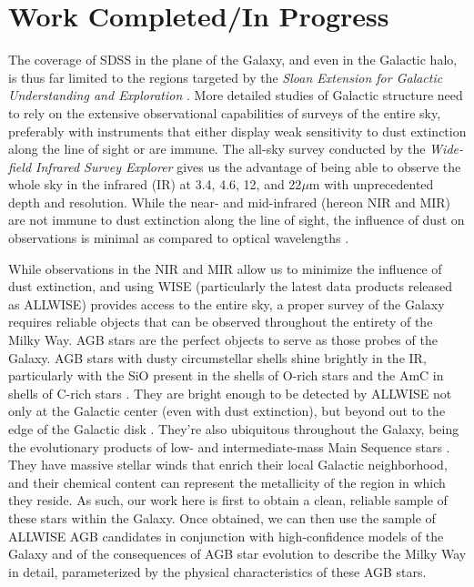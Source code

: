 \section{Work Completed/In Progress}
\label{sec:completedWork}
The coverage of SDSS in the plane of the Galaxy, and even in the Galactic halo, is thus far limited to the regions targeted by the \emph{Sloan Extension for Galactic Understanding and Exploration} \citep[SEGUE, ][]{2012ApJ...757..166B}. More detailed studies of Galactic structure need to rely on the extensive observational capabilities of surveys of the entire sky, preferably with instruments that either display weak sensitivity to dust extinction along the line of sight or are immune. The all-sky survey conducted by the \emph{Wide-field Infrared Survey Explorer} \citep[WISE,][]{2012wise.rept....1C} gives us the advantage of being able to observe the whole sky in the infrared (IR) at 3.4, 4.6, 12, and 22$\mu$m with unprecedented depth and resolution. While the near- and mid-infrared (hereon NIR and MIR) are not immune to dust extinction along the line of sight, the influence of dust on observations is minimal as compared to optical wavelengths \citep{2012ApJ...757..166B}. 

While observations in the NIR and MIR allow us to minimize the influence of dust extinction, and using WISE (particularly the latest data products released as ALLWISE) provides access to the entire sky, a proper survey of the Galaxy requires reliable objects that can be observed throughout the entirety of the Milky Way. AGB stars are the perfect objects to serve as those probes of the Galaxy. AGB stars with dusty circumstellar shells shine brightly in the IR, particularly with the SiO present in the shells of O-rich stars and the AmC in shells of C-rich stars \citep{2011A&A...534A..79I}. They are bright enough to be detected by ALLWISE not only at the Galactic center (even with dust extinction), but beyond out to the edge of the Galactic disk \citep{2013RAA....13..323T}. They're also ubiquitous throughout the Galaxy, being the evolutionary products of low- and intermediate-mass Main Sequence stars \citep{1983ARA&A..21..271I}. They have massive stellar winds that enrich their local Galactic neighborhood, and their chemical content can represent the metallicity of the region in which they reside. As such, our work here is first to obtain a clean, reliable sample of these stars within the Galaxy. Once obtained, we can then use the sample of ALLWISE AGB candidates in conjunction with high-confidence models of the Galaxy and of the consequences of AGB star evolution to describe the Milky Way in detail, parameterized by the physical characteristics of these AGB stars.

